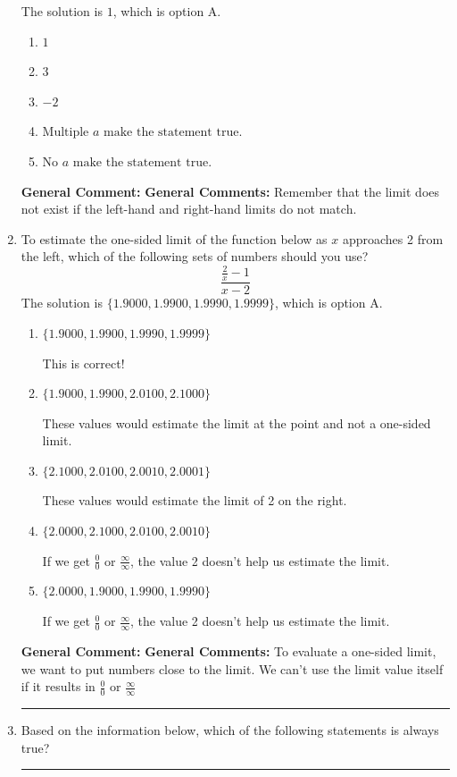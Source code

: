 \documentclass{extbook}[14pt]
\newcommand{\litem}[1]{\item #1

\rule{\textwidth}{0.4pt}}
\begin{document}
\begin{enumerate}
{The solution is \( 1 \), which is option A.\begin{enumerate}[label=\Alph*.]
\item \( 1 \)


\item \( 3 \)


\item \( -2 \)


\item \( \text{Multiple } a \text{ make the statement true}. \)


\item \( \text{No } a \text{ make the statement true}. \)


\end{enumerate}

\textbf{General Comment:} \textbf{General Comments:} Remember that the limit does not exist if the left-hand and right-hand limits do not match.
}
\litem{
To estimate the one-sided limit of the function below as $x$ approaches 2 from the left, which of the following sets of numbers should you use?
\[ \frac{\frac{2}{x} - 1}{x - 2} \]The solution is \( \{ 1.9000, 1.9900, 1.9990, 1.9999 \} \), which is option A.\begin{enumerate}[label=\Alph*.]
\item \( \{ 1.9000, 1.9900, 1.9990, 1.9999 \} \)

This is correct!
\item \( \{ 1.9000, 1.9900, 2.0100, 2.1000 \} \)

These values would estimate the limit at the point and not a one-sided limit.
\item \( \{ 2.1000, 2.0100, 2.0010, 2.0001 \} \)

These values would estimate the limit of 2 on the right.
\item \( \{ 2.0000, 2.1000, 2.0100, 2.0010 \} \)

If we get $\frac{0}{0}$ or $\frac{\infty}{\infty}$, the value 2 doesn't help us estimate the limit.
\item \( \{ 2.0000, 1.9000, 1.9900, 1.9990 \} \)

If we get $\frac{0}{0}$ or $\frac{\infty}{\infty}$, the value 2 doesn't help us estimate the limit.
\end{enumerate}

\textbf{General Comment:} \textbf{General Comments:} To evaluate a one-sided limit, we want to put numbers close to the limit. We can't use the limit value itself if it results in $\frac{0}{0}$ or $\frac{\infty}{\infty}$
}
\litem{
Based on the information below, which of the following statements is always true?

}
\end{enumerate}
\end{document}
